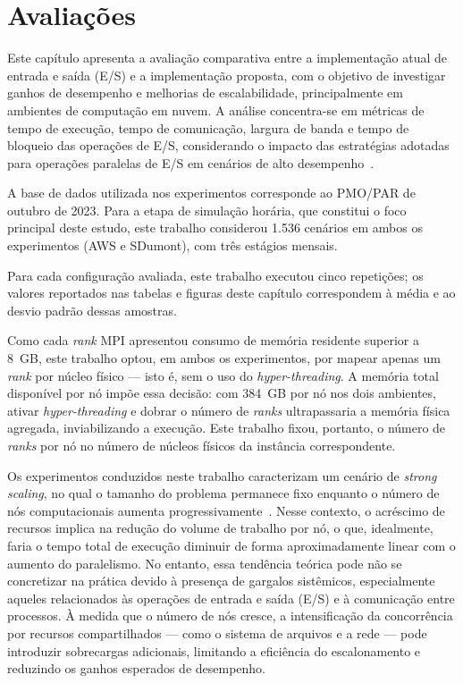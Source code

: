 \chapter{Avaliações}
\label{cap:avaliacoes}

Este capítulo apresenta a avaliação comparativa entre a implementação atual
de entrada e saída (E/S) e a implementação proposta, com o objetivo de
investigar ganhos de desempenho e melhorias de escalabilidade,
principalmente em ambientes de computação em nuvem. A análise concentra-se
em métricas de tempo de execução, tempo de comunicação, largura de banda e
tempo de bloqueio das operações de E/S, considerando o impacto das
estratégias adotadas para operações paralelas de E/S em cenários de alto
desempenho~\cite{Rwe:99,Phrrbrw:09}.

A base de dados utilizada nos experimentos corresponde ao PMO/PAR de
outubro de 2023. Para a etapa de simulação horária, que constitui o foco
principal deste estudo, este trabalho considerou 1.536 cenários em ambos os
experimentos (AWS e SDumont), com três estágios mensais.

Para cada configuração avaliada, este trabalho executou cinco repetições;
os valores reportados nas tabelas e figuras deste capítulo correspondem à
média e ao desvio padrão dessas amostras.

Como cada \textit{rank} MPI apresentou consumo de memória residente
superior a 8~GB, este trabalho optou, em ambos os experimentos, por mapear
apenas um \textit{rank} por núcleo físico --- isto é, sem o uso do
\textit{hyper-threading}. A memória total disponível por nó impõe essa
decisão: com 384~GB por nó nos dois ambientes, ativar
\textit{hyper-threading} e dobrar o número de \textit{ranks}
ultrapassaria a memória física agregada, inviabilizando a execução. Este
trabalho fixou, portanto, o número de \textit{ranks} por nó no número de
núcleos físicos da instância correspondente.

Os experimentos conduzidos neste trabalho caracterizam um cenário de
\textit{strong scaling}, no qual o tamanho do problema permanece fixo
enquanto o número de nós computacionais aumenta
progressivamente~\cite{Amdahl:67}.
Nesse contexto, o acréscimo de recursos implica na redução do volume de
trabalho por nó, o que, idealmente, faria o tempo total de execução
diminuir de forma aproximadamente linear com o aumento do paralelismo. No
entanto, essa tendência teórica pode não se concretizar na prática devido
à presença de gargalos sistêmicos, especialmente aqueles relacionados às
operações de entrada e saída (E/S) e à comunicação entre processos. À
medida que o número de nós cresce, a intensificação da concorrência por
recursos compartilhados --- como o sistema de arquivos e a rede --- pode
introduzir sobrecargas adicionais, limitando a eficiência do escalonamento
e reduzindo os ganhos esperados de desempenho.

